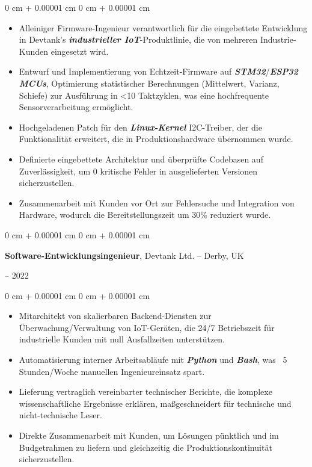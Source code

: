 \documentclass[10pt, letterpaper]{article}
\newenvironment{highlights}{
    \begin{itemize}[
        topsep=0.2 cm,
        parsep=0.2 cm,
        partopsep=0pt,
        itemsep=0.025 cm,
        leftmargin=0 cm + 10pt
    ]
}{
    \end{itemize}
}
\newenvironment{onecolentry}{
    \begin{adjustwidth}{
        0 cm + 0.00001 cm
    }{
        0 cm + 0.00001 cm
    }
}{
    \end{adjustwidth}
}
\newenvironment{twocolentry}[2][]{
    \onecolentry
    \def\secondColumn{#2}
    \setcolumnwidth{\fill, 4.75 cm}
    \begin{paracol}{2}
}{
    \switchcolumn \raggedleft \secondColumn
    \end{paracol}
    \endonecolentry
}
\begin{document}
        \vspace{0.10 cm}
        \begin{onecolentry}
            \begin{highlights}
            \item Alleiniger Firmware-Ingenieur verantwortlich für die eingebettete Entwicklung in Devtank’s \textbf{\textit{industrieller IoT}}-Produktlinie, die von mehreren Industrie-Kunden eingesetzt wird.
            \item Entwurf und Implementierung von Echtzeit-Firmware auf \textbf{\textit{STM32}}/\textbf{\textit{ESP32 MCUs}}, Optimierung statistischer Berechnungen (Mittelwert, Varianz, Schiefe) zur Ausführung in <10 Taktzyklen, was eine hochfrequente Sensorverarbeitung ermöglicht.
            \item Hochgeladenen Patch für den \textbf{\textit{Linux-Kernel}} I2C-Treiber, der die Funktionalität erweitert, die in Produktionshardware übernommen wurde.
            \item Definierte eingebettete Architektur und überprüfte Codebasen auf Zuverlässigkeit, um 0 kritische Fehler in ausgelieferten Versionen sicherzustellen.
            \item Zusammenarbeit mit Kunden vor Ort zur Fehlersuche und Integration von Hardware, wodurch die Bereitstellungszeit um 30\% reduziert wurde.
            \end{highlights}
        \end{onecolentry}


        \vspace{0.2 cm}

        \begin{twocolentry}{
            2020 – 2022
        }
            \textbf{Software-Entwicklungsingenieur}, Devtank Ltd. -- Derby, UK
        \end{twocolentry}

        \vspace{0.10 cm}
        \begin{onecolentry}
            \begin{highlights}
                \item Mitarchitekt von skalierbaren Backend-Diensten zur Überwachung/Verwaltung von IoT-Geräten, die 24/7 Betriebszeit für industrielle Kunden mit null Ausfallzeiten unterstützen.
                \item Automatisierung interner Arbeitsabläufe mit \textbf{\textit{Python}} und \textbf{\textit{Bash}}, was ~5 Stunden/Woche manuellen Ingenieureinsatz spart.
                \item Lieferung vertraglich vereinbarter technischer Berichte, die komplexe wissenschaftliche Ergebnisse erklären, maßgeschneidert für technische und nicht-technische Leser.
                \item Direkte Zusammenarbeit mit Kunden, um Lösungen pünktlich und im Budgetrahmen zu liefern und gleichzeitig die Produktionskontinuität sicherzustellen.
            \end{highlights}
        \end{onecolentry}
\end{document}
